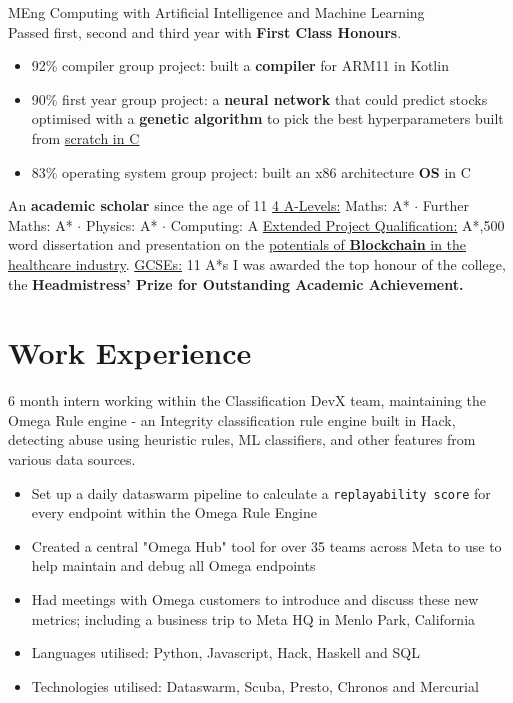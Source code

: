 \documentclass{my_cv}
\begin{document}
MEng Computing with Artificial Intelligence and Machine Learning\\
Passed first, second and third year with \textbf{First Class Honours}.
\begin{itemize}
\itemsep0em 
\item 92\% compiler group project: built a \textbf{compiler} for ARM11 in Kotlin
\item 90\% first year group project: a \textbf{neural network} that could predict stocks optimised with a \textbf{genetic algorithm} to pick the best hyperparameters built from \underline{\href{https://github.com/lagercat/genetic_stocks}{scratch in C}}
\item 83\% operating system group project: built an x86 architecture \textbf{OS} in C
\end{itemize}
An \textbf{academic scholar} since the age of 11 \newline
\underline{4 A-Levels:}\newline
Maths: A* $\cdot$ Further Maths: A* $\cdot$ Physics: A* $\cdot$ Computing: A\newline
\underline{Extended Project Qualification:} A*,500 word dissertation and presentation on the \underline{\href{https://github.com/EuanScottWatson/Blockchain-In-Healthcare}{potentials of \textbf{Blockchain} in the healthcare industry}}. \newline
\underline{GCSEs:} 11 A*s \newline
I was awarded the top honour of the college, the \textbf{Headmistress' Prize for Outstanding Academic Achievement.}

\section{Work Experience}
6 month intern working within the Classification DevX team, maintaining the Omega Rule engine - an Integrity classification rule engine built in Hack, detecting abuse using heuristic rules, ML classifiers, and other features from various data sources.

\begin{itemize}

\itemsep0em 
\item Set up a daily dataswarm pipeline to calculate a \verb|replayability score| for every endpoint within the Omega Rule Engine
\item Created a central "Omega Hub" tool for over 35 teams across Meta to use to help maintain and debug all Omega endpoints
\item Had meetings with Omega customers to introduce and discuss these new metrics; including a business trip to Meta HQ in Menlo Park, California
\item Languages utilised: Python, Javascript, Hack, Haskell and SQL
\item Technologies utilised: Dataswarm, Scuba, Presto, Chronos and Mercurial
\end{itemize}
\end{document}
